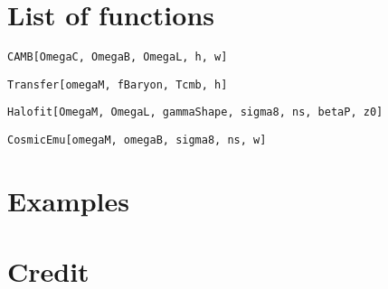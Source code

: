 \documentclass{article}
\begin{document}
\section{List of functions}

\verb#CAMB[OmegaC, OmegaB, OmegaL, h, w]#

\verb#Transfer[omegaM, fBaryon, Tcmb, h]#

\verb#Halofit[OmegaM, OmegaL, gammaShape, sigma8, ns, betaP, z0]#

\verb#CosmicEmu[omegaM, omegaB, sigma8, ns, w]#

\section{Examples}



\section{Credit}
\end{document}

